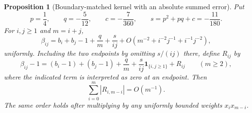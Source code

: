 \documentclass[11pt,letterpaper]{article}
\newtheorem{proposition}[theorem]{Proposition}
\theoremstyle{remark}\newtheorem{remark}[theorem]{Remark}
\numberwithin{equation}{section}
\begin{document}
\begin{proposition}[Boundary-matched kernel with an absolute summed error]\label{ppg:log:prop:matched}
Put
\begin{equation}\label{ppg:log:eq:pqs}
 p=\frac14,\qquad q=-\frac5{12},\qquad c=-\frac7{360},\qquad
 s=p^2+pq+c=-\frac{11}{180}.
\end{equation}
For $i,j\ge1$ and $m=i+j$,
\begin{equation}\label{ppg:log:eq:matched}
 \beta_{ij}=b_i+b_j-1+\frac q m+\frac s{ij}
       +O\!\left(m^{-2}+i^{-2}j^{-1}+i^{-1}j^{-2}\right),
\end{equation}
uniformly. Including the two endpoints by omitting $s/(ij)$ there, define $R_{ij}$ by
\begin{equation}\label{ppg:log:eq:matchedall}
 \beta_{ij}-1=(b_i-1)+(b_j-1)+\frac q m
       +\frac s{ij}\mathbf1_{\{i,j\ge1\}}+R_{ij}\qquad(m\ge2),
\end{equation}
where the indicated term is interpreted as zero at an endpoint. Then
\begin{equation}\label{ppg:log:eq:summedR}
 \sum_{i=0}^m|R_{i,m-i}|=O(m^{-1}).
\end{equation}
The same order holds after multiplying by any uniformly bounded weights $x_ix_{m-i}$.
\end{proposition}
\end{document}
